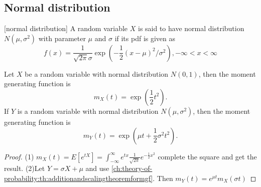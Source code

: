 \begin{refsection}
\subsection{Normal distribution}\label{ch:theory-of-statistics:sec:normaldistribution}
\begin{definition}\cite[171]{hoggintroduction}[normal distribution]
A random variable $X$ is said to have normal distribution $N(\mu,\sigma^2)$ with parameter $\mu$ and $\sigma$ if its pdf is given as
$$f(x) = \frac{1}{\sqrt{2\pi} \sigma} \exp(-\frac{1}{2}(x-\mu)^2/\sigma^2),-\infty < x <\infty $$
\end{definition}


\begin{lemma}
Let $X$ be a random variable with normal distribution $N(0,1)$, then the moment generating function is
$$m_X(t) = \exp(\frac{1}{2}t^2).$$
If $Y$ is a random variable with normal distribution $N(\mu,\sigma^2)$, then the moment generating function is
$$m_Y(t) = \exp(\mu t + \frac{1}{2}\sigma^2 t^2).$$
\end{lemma}
\begin{proof}
(1) $m_X(t) = E[e^{tX}] = \int_{-\infty}^{\infty} e^{tx}\frac{1}{\sqrt{2\pi}}e^{-\frac{1}{2}x^2}$
complete the square and get the result.
(2)Let $Y=\sigma X + \mu$ and use \autoref{ch:theory-of-probability:th:additionandscalingtheoremformgf}. Then $m_Y(t) = e^{\mu t}m_X(\sigma t)$	
\end{proof}


\end{refsection}

